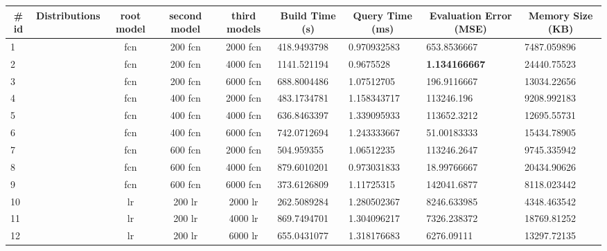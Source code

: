 \begingroup
\fontsize{8pt}{10pt}\selectfont
\begin{landscape}
\begin{table}[]
\footnotesize
\begin{tabular}{|c|c|c|c|c|l|l|l|l|}
\hline
\textbf{\# id} & \textbf{Distributions} & \textbf{root model} & \textbf{second model} & \textbf{third models} & \multicolumn{1}{c|}{\textbf{Build Time (s)}} & \multicolumn{1}{c|}{\textbf{Query Time (ms)}} & \multicolumn{1}{c|}{\textbf{Evaluation   Error (MSE)}} & \multicolumn{1}{c|}{\textbf{Memory Size   (KB)}} \\ \hline
\multicolumn{1}{|l|}{1} &  & fcn & 200 fcn & 2000 fcn & 418.9493798 & 0.970932583 & 653.8536667 & 7487.059896 \\ \cline{1-1} \cline{3-9} 
\multicolumn{1}{|l|}{2} &  & fcn & 200 fcn & 4000 fcn & 1141.521194 & 0.9675528 & \textbf{1.134166667} & 24440.75523 \\ \cline{1-1} \cline{3-9} 
\multicolumn{1}{|l|}{3} &  & fcn & 200 fcn & 6000 fcn & 688.8004486 & 1.07512705 & 196.9116667 & 13034.22656 \\ \cline{1-1} \cline{3-9} 
\multicolumn{1}{|l|}{4} &  & fcn & 400 fcn & 2000 fcn & 483.1734781 & 1.158343717 & 113246.196 & 9208.992183 \\ \cline{1-1} \cline{3-9} 
\multicolumn{1}{|l|}{5} &  & fcn & 400 fcn & 4000 fcn & 636.8463397 & 1.339095933 & 113652.3212 & 12695.55731 \\ \cline{1-1} \cline{3-9} 
\multicolumn{1}{|l|}{6} &  & fcn & 400 fcn & 6000 fcn & 742.0712694 & 1.243333667 & 51.00183333 & 15434.78905 \\ \cline{1-1} \cline{3-9} 
\multicolumn{1}{|l|}{7} &  & fcn & 600 fcn & 2000 fcn & 504.959355 & 1.06512235 & 113246.2647 & 9745.335942 \\ \cline{1-1} \cline{3-9} 
\multicolumn{1}{|l|}{8} &  & fcn & 600 fcn & 4000 fcn & 879.6010201 & 0.973031833 & 18.99766667 & 20434.90626 \\ \cline{1-1} \cline{3-9} 
\multicolumn{1}{|l|}{9} &  & fcn & 600 fcn & 6000 fcn & 373.6126809 & 1.11725315 & 142041.6877 & 8118.023442 \\ \cline{1-1} \cline{3-9} 
\multicolumn{1}{|l|}{10} &  & lr & 200 lr & 2000 lr & 262.5089284 & 1.280502367 & 8246.633985 & 4348.463542 \\ \cline{1-1} \cline{3-9} 
\multicolumn{1}{|l|}{11} &  & lr & 200 lr & 4000 lr & 869.7494701 & 1.304096217 & 7326.238372 & 18769.81252 \\ \cline{1-1} \cline{3-9} 
\multicolumn{1}{|l|}{12} &  & lr & 200 lr & 6000 lr & 655.0431077 & 1.318176683 & 6276.09111 & 13297.72135 \\ \cline{1-1} \cline{3-9} 

\end{tabular}
\end{table}
\end{landscape}
